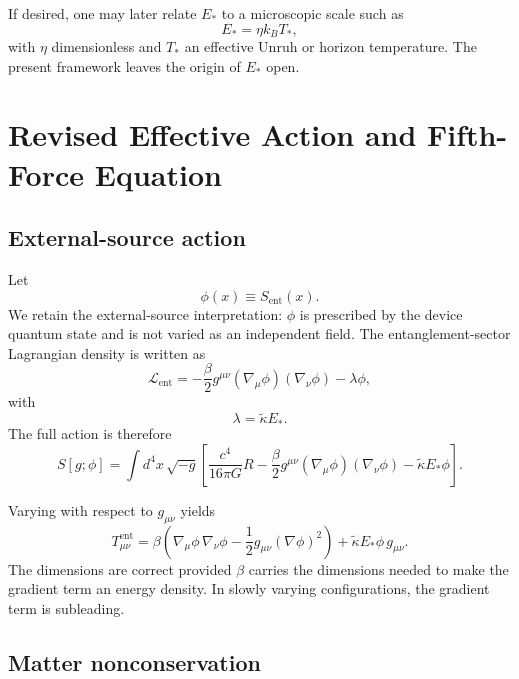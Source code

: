 \documentclass[11pt]{article}
\theoremstyle{plain}
\theoremstyle{definition}
\theoremstyle{remark}
\begin{document}
If desired, one may later relate $E_*$ to a microscopic scale such as
\begin{equation}
E_* = \eta k_B T_*,
\end{equation}
with $\eta$ dimensionless and $T_*$ an effective Unruh or horizon temperature. The present framework leaves the origin of $E_*$ open.

\section{Revised Effective Action and Fifth-Force Equation}

\subsection{External-source action}

Let
\begin{equation}
\phi(x) \equiv S_{\mathrm{ent}}(x).
\end{equation}
We retain the external-source interpretation: $\phi$ is prescribed by the device quantum state and is not varied as an independent field. The entanglement-sector Lagrangian density is written as
\begin{equation}
\mathcal{L}_{\mathrm{ent}} = -\frac{\beta}{2} g^{\mu\nu}(\nabla_\mu\phi)(\nabla_\nu\phi) - \lambda\phi,
\end{equation}
with
\begin{equation}
\lambda = \tilde{\kappa} E_*.
\end{equation}
The full action is therefore
\begin{equation}
S[g;\phi] = \int d^4x\,\sqrt{-g}\left[\frac{c^4}{16\pi G}R - \frac{\beta}{2} g^{\mu\nu}(\nabla_\mu\phi)(\nabla_\nu\phi) - \tilde{\kappa} E_*\phi\right].
\end{equation}

Varying with respect to $g_{\mu\nu}$ yields
\begin{equation}
T^{\mathrm{ent}}_{\mu\nu} = \beta\left(\nabla_\mu\phi\,\nabla_\nu\phi - \frac{1}{2}g_{\mu\nu}(\nabla\phi)^2\right) + \tilde{\kappa} E_*\phi\, g_{\mu\nu}.
\end{equation}
The dimensions are correct provided $\beta$ carries the dimensions needed to make the gradient term an energy density. In slowly varying configurations, the gradient term is subleading.

\subsection{Matter nonconservation}
\end{document}
